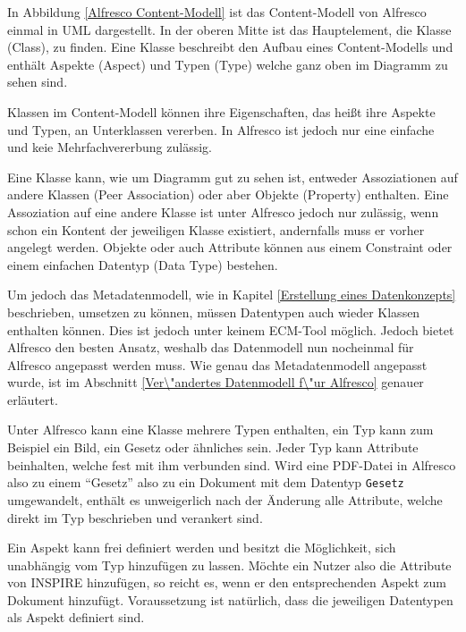 In Abbildung \ref{Alfresco Content-Modell} ist das Content-Modell von Alfresco einmal in UML dargestellt. In der oberen Mitte ist das Hauptelement, die Klasse (Class), zu finden. Eine Klasse beschreibt den Aufbau eines Content-Modells und enth\"alt Aspekte (Aspect) und Typen (Type) welche ganz oben im Diagramm zu sehen sind. \cite{Professional_Alfresco}

Klassen im Content-Modell k\"onnen ihre Eigenschaften, das hei\ss{}t ihre Aspekte und Typen, an Unterklassen vererben. In Alfresco ist jedoch nur eine einfache und keie Mehrfachvererbung zul\"assig.

Eine Klasse kann, wie um Diagramm gut zu sehen ist, entweder Assoziationen auf andere Klassen (Peer Association) oder aber Objekte (Property) enthalten. Eine Assoziation auf eine andere Klasse ist unter Alfresco jedoch nur zul\"assig, wenn schon ein Kontent der jeweiligen Klasse existiert, andernfalls muss er vorher angelegt werden. Objekte oder auch Attribute k\"onnen aus einem Constraint oder einem einfachen Datentyp (Data Type) bestehen.

Um jedoch das Metadatenmodell, wie in Kapitel \ref{Erstellung eines Datenkonzepts} beschrieben, umsetzen zu k\"onnen, m\"ussen Datentypen auch wieder Klassen enthalten k\"onnen. Dies ist jedoch unter keinem \ac{ECM}-Tool m\"oglich. Jedoch bietet Alfresco den besten Ansatz, weshalb das Datenmodell nun nocheinmal f\"ur Alfresco angepasst werden muss. Wie genau das Metadatenmodell angepasst wurde, ist im Abschnitt \ref{Ver\"andertes Datenmodell f\"ur Alfresco} genauer erl\"autert.

Unter Alfresco kann eine Klasse mehrere Typen enthalten, ein Typ kann zum Beispiel ein Bild, ein Gesetz oder \"ahnliches sein. Jeder Typ kann Attribute beinhalten, welche fest mit ihm verbunden sind. Wird eine PDF-Datei in Alfresco also zu einem "`Gesetz"' also zu ein Dokument mit dem Datentyp \texttt{Gesetz} umgewandelt, enth\"alt es unweigerlich nach der \"Anderung alle Attribute, welche direkt im Typ beschrieben und verankert sind.

Ein Aspekt kann frei definiert werden und besitzt die M\"oglichkeit, sich unabh\"angig vom Typ hinzuf\"ugen zu lassen. M\"ochte ein Nutzer also die Attribute von \ac{INSPIRE} hinzuf\"ugen, so reicht es, wenn er den entsprechenden Aspekt zum Dokument hinzuf\"ugt. Voraussetzung ist nat\"urlich, dass die jeweiligen Datentypen als Aspekt definiert sind.

